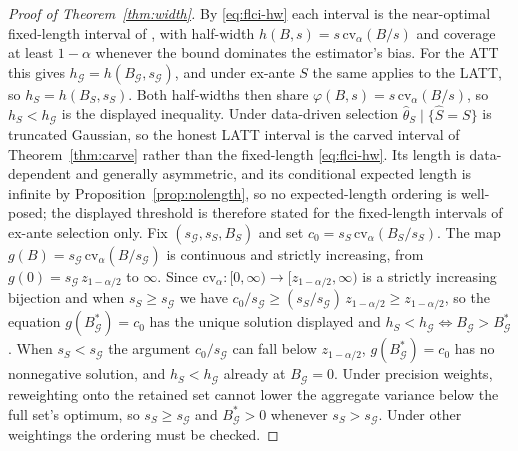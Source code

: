 \documentclass[12pt]{article}
\theoremstyle{remark}
\begin{document}
\begin{proof}[Proof of Theorem~\ref{thm:width}]
By \eqref{eq:flci-hw} each interval is the near-optimal fixed-length interval of
\citet{armstrong2018}, with half-width $h(B,s)=s\,\mathrm{cv}_\alpha(B/s)$ and coverage at least
$1-\alpha$ whenever the bound dominates the estimator's bias. For the ATT this gives
$h_{\mathcal G}=h(B_{\mathcal G},s_{\mathcal G})$, and under ex-ante $S$ the same applies to the
LATT, so $h_S=h(B_S,s_S)$. Both half-widths then share $\varphi(B,s)=s\,\mathrm{cv}_\alpha(B/s)$, so
$h_S<h_{\mathcal G}$ is the displayed inequality. Under data-driven selection
$\hat\theta_S\mid\{\hat S=S\}$ is truncated Gaussian, so the honest LATT interval is the carved interval of
Theorem~\ref{thm:carve} rather than the fixed-length \eqref{eq:flci-hw}. Its length is data-dependent and
generally asymmetric, and its conditional expected length is infinite by
Proposition~\ref{prop:nolength}, so no expected-length ordering is well-posed; the displayed threshold is
therefore stated for the fixed-length intervals of ex-ante selection only.
Fix $(s_{\mathcal G},s_S,B_S)$ and set
$c_0=s_S\,\mathrm{cv}_\alpha(B_S/s_S)$. The map $g(B)=s_{\mathcal G}\,\mathrm{cv}_\alpha(B/s_{\mathcal G})$
is continuous and strictly increasing, from $g(0)=s_{\mathcal G}\,z_{1-\alpha/2}$ to $\infty$. Since
$\mathrm{cv}_\alpha:[0,\infty)\to[z_{1-\alpha/2},\infty)$ is a strictly increasing bijection and
when $s_S\ge s_{\mathcal G}$ we have $c_0/s_{\mathcal G}\ge (s_S/s_{\mathcal G})\,z_{1-\alpha/2}\ge
z_{1-\alpha/2}$, so the equation $g(B_{\mathcal G}^\ast)=c_0$ has the unique solution displayed and
$h_S<h_{\mathcal G}\iff B_{\mathcal G}>B_{\mathcal G}^\ast$. When $s_S<s_{\mathcal G}$ the argument
$c_0/s_{\mathcal G}$ can fall below $z_{1-\alpha/2}$, $g(B_{\mathcal G}^\ast)=c_0$ has no nonnegative
solution, and $h_S<h_{\mathcal G}$ already at $B_{\mathcal G}=0$. Under precision weights, reweighting onto
the retained set cannot lower the aggregate variance below the full set's optimum, so $s_S\ge s_{\mathcal G}$
and $B_{\mathcal G}^\ast>0$ whenever $s_S>s_{\mathcal G}$. Under other weightings the ordering must be checked.
\end{proof}
\end{document}
